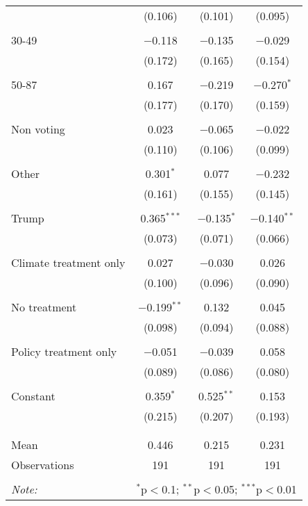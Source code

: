 \begin{tabular}{@{\extracolsep{5pt}}lccc}
  & (0.106) & (0.101) & (0.095) \\ 
  & & & \\ 
 30-49 & $-$0.118 & $-$0.135 & $-$0.029 \\ 
  & (0.172) & (0.165) & (0.154) \\ 
  & & & \\ 
 50-87 & 0.167 & $-$0.219 & $-$0.270$^{*}$ \\ 
  & (0.177) & (0.170) & (0.159) \\ 
  & & & \\ 
 Non voting & 0.023 & $-$0.065 & $-$0.022 \\ 
  & (0.110) & (0.106) & (0.099) \\ 
  & & & \\ 
 Other & 0.301$^{*}$ & 0.077 & $-$0.232 \\ 
  & (0.161) & (0.155) & (0.145) \\ 
  & & & \\ 
 Trump & 0.365$^{***}$ & $-$0.135$^{*}$ & $-$0.140$^{**}$ \\ 
  & (0.073) & (0.071) & (0.066) \\ 
  & & & \\ 
 Climate treatment only & 0.027 & $-$0.030 & 0.026 \\ 
  & (0.100) & (0.096) & (0.090) \\ 
  & & & \\ 
 No treatment & $-$0.199$^{**}$ & 0.132 & 0.045 \\ 
  & (0.098) & (0.094) & (0.088) \\ 
  & & & \\ 
 Policy treatment only & $-$0.051 & $-$0.039 & 0.058 \\ 
  & (0.089) & (0.086) & (0.080) \\ 
  & & & \\ 
 Constant & 0.359$^{*}$ & 0.525$^{**}$ & 0.153 \\ 
  & (0.215) & (0.207) & (0.193) \\ 
  & & & \\ 
\hline \\[-1.8ex] 
Mean & 0.446 & 0.215 & 0.231 \\ 
Observations & 191 & 191 & 191 \\ 
\hline 
\hline \\[-1.8ex] 
\textit{Note:}  & \multicolumn{3}{r}{$^{*}$p$<$0.1; $^{**}$p$<$0.05; $^{***}$p$<$0.01} \\ 
\end{tabular} 
